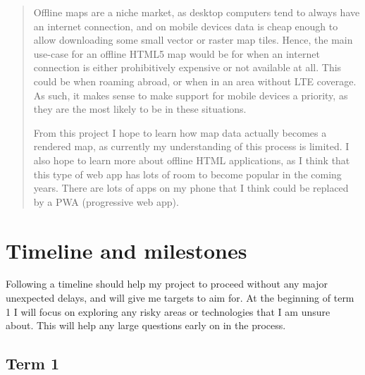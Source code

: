 \documentclass[]{final_report}
\begin{document}
\begin{abstract}
Offline maps are a niche market, as desktop computers tend to always have an internet connection, and on mobile devices data is cheap enough to allow downloading some small vector or raster map tiles. Hence, the main use-case for an offline HTML5 map would be for when an internet connection is either prohibitively expensive or not available at all. This could be when roaming abroad, or when in an area without LTE coverage. As such, it makes sense to make support for mobile devices a priority, as they are the most likely to be in these situations.

From this project I hope to learn how map data actually becomes a rendered map, as currently my understanding of this process is limited. I also hope to learn more about offline HTML applications, as I think that this type of web app has lots of room to become popular in the coming years. There are lots of apps on my phone that I think could be replaced by a PWA (progressive web app).

\end{abstract}


\chapter{Timeline and milestones}

Following a timeline should help my project to proceed without any major unexpected delays, and will give me targets to aim for. At the beginning of term 1 I will focus on exploring any risky areas or technologies that I am unsure about. This will help any large questions early on in the process.

\section{Term 1}
\end{document}
